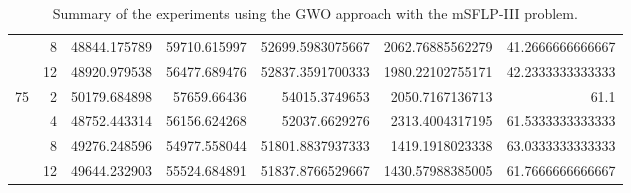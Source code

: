 \begin{table}
{{\begin{tabular}{|r|r|r|r|r|r|r|}
	\cline{2-7}
	& 8                               & 48844.175789                       & 59710.615997                        & 52699.5983075667                   & 2062.76885562279                        & 41.2666666666667                                \\ 
	\cline{2-7}
	& 12                              & 48920.979538                       & 56477.689476                        & 52837.3591700333                   & 1980.22102755171                        & 42.2333333333333                                \\ 
	\hline
	\multirow{4}{*}{75}                      & 2                               & 50179.684898                       & 57659.66436                         & 54015.3749653                      & 2050.7167136713                         & 61.1                                            \\ 
	\cline{2-7}
	& 4                               & 48752.443314                       & 56156.624268                        & 52037.6629276                      & 2313.4004317195                         & 61.5333333333333                                \\ 
	\cline{2-7}
	& 8                               & 49276.248596                       & 54977.558044                        & 51801.8837937333                   & 1419.1918023338                         & 63.0333333333333                                \\ 
	\cline{2-7}
	& 12                              & 49644.232903                       & 55524.684891                        & 51837.8766529667                   & 1430.57988385005                        & 61.7666666666667                                \\
	\hline
\end{tabular}}}
\caption{Summary of the experiments using the GWO approach with the mSFLP-III problem.}
\label{full-data-gwo-msflp-iii}
\end{table}

